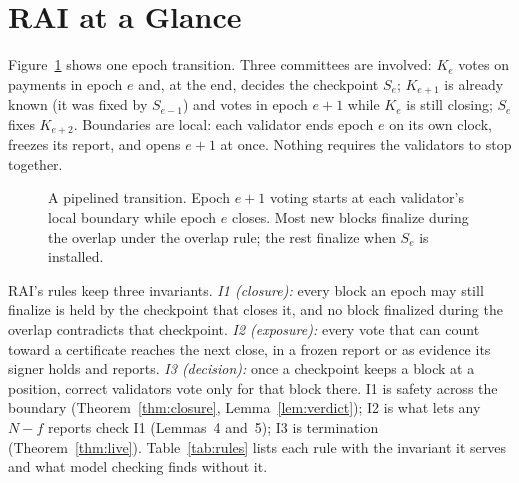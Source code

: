 \section{RAI at a Glance}
\label{sec:glance}
Figure~\ref{fig:pipeline} shows one epoch transition. Three committees are involved: $K_e$ votes on payments in epoch $e$ and, at the end, decides the checkpoint $S_e$; $K_{e+1}$ is already known (it was fixed by $S_{e-1}$) and votes in epoch $e+1$ while $K_e$ is still closing; $S_e$ fixes $K_{e+2}$. Boundaries are local: each validator ends epoch $e$ on its own clock, freezes its report, and opens $e+1$ at once. Nothing requires the validators to stop together.

\begin{figure}[t]
\centering
{}
\caption{A pipelined transition. Epoch $e+1$ voting starts at each validator's local boundary while epoch $e$ closes. Most new blocks finalize during the overlap under the overlap rule; the rest finalize when $S_e$ is installed.}
\label{fig:pipeline}
\end{figure}

RAI's rules keep three invariants. \emph{I1 (closure):} every block an epoch may still finalize is held by the checkpoint that closes it, and no block finalized during the overlap contradicts that checkpoint. \emph{I2 (exposure):} every vote that can count toward a certificate reaches the next close, in a frozen report or as evidence its signer holds and reports. \emph{I3 (decision):} once a checkpoint keeps a block at a position, correct validators vote only for that block there. I1 is safety across the boundary (Theorem~\ref{thm:closure}, Lemma~\ref{lem:verdict}); I2 is what lets any $N-f$ reports check I1 (Lemmas~4 and~5); I3 is termination (Theorem~\ref{thm:live}). Table~\ref{tab:rules} lists each rule with the invariant it serves and what model checking finds without it.

